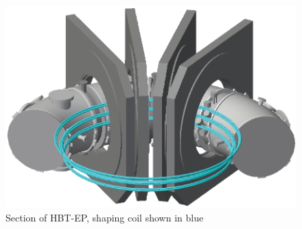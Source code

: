 \documentclass[aps,prl,twocolumn,superscriptaddress,groupedaddress]{revtex4}  %
\begin{document}
		
\begin{figure}[b]
	\centering
\includegraphics[scale=.35]{../Plots/HBT_section_cropped.png}\caption{Section of HBT-EP, shaping coil shown in blue}
	\label{Coil_HBT_Section}
	\end{figure}
		
\end{document}

